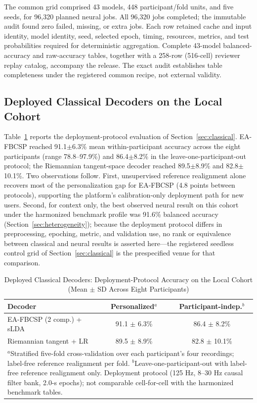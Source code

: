 \documentclass[journal,twoside,web]{template/ieeecolor2-tectonic}
\begin{document}
The common grid comprised 43 models, 448 participant/fold units, and five seeds, for 96,320 planned neural jobs. All 96,320 jobs completed; the immutable audit found zero failed, missing, or extra jobs. Each row retained cache and input identity, model identity, seed, selected epoch, timing, resources, metrics, and test probabilities required for deterministic aggregation. Complete 43-model balanced-accuracy and raw-accuracy tables, together with a 258-row (516-cell) reviewer replay catalog, accompany the release. The exact audit establishes table completeness under the registered common recipe, not external validity.

\subsection{Deployed Classical Decoders on the Local Cohort}

Table~\ref{tab:classical} reports the deployment-protocol evaluation of Section~\ref{sec:classical}. EA-FBCSP reached 91.1$\pm$6.3\% mean within-participant accuracy across the eight participants (range 78.8--97.9\%) and 86.4$\pm$8.2\% in the leave-one-participant-out protocol; the Riemannian tangent-space decoder reached 89.5$\pm$8.9\% and 82.8$\pm$10.1\%. Two observations follow. First, unsupervised reference realignment alone recovers most of the personalization gap for EA-FBCSP (4.8 points between protocols), supporting the platform's calibration-only deployment path for new users. Second, for context only, the best observed neural result on this cohort under the harmonized benchmark profile was 91.6\% balanced accuracy (Section~\ref{sec:heterogeneity}); because the deployment protocol differs in preprocessing, epoching, metric, and validation use, no rank or equivalence between classical and neural results is asserted here---the registered seedless control grid of Section~\ref{sec:classical} is the prespecified venue for that comparison.

\begin{table}[t]
\caption{Deployed Classical Decoders: Deployment-Protocol Accuracy on the Local Cohort (Mean $\pm$ SD Across Eight Participants)}
\label{tab:classical}
\centering
\scriptsize
\setlength{\tabcolsep}{4pt}
\begin{tabular}{lcc}
\toprule
Decoder & Personalized$^a$ & Participant-indep.$^b$ \\
\midrule
EA-FBCSP (2 comp.) + sLDA & 91.1 $\pm$ 6.3\% & 86.4 $\pm$ 8.2\% \\
Riemannian tangent + LR & 89.5 $\pm$ 8.9\% & 82.8 $\pm$ 10.1\% \\
\bottomrule
\multicolumn{3}{p{0.94\columnwidth}}{$^a$Stratified five-fold cross-validation over each participant's four recordings; label-free reference realignment per fold. $^b$Leave-one-participant-out with label-free reference realignment only. Deployment protocol (125 Hz, 8--30 Hz causal filter bank, 2.0-s epochs); not comparable cell-for-cell with the harmonized benchmark tables.} \\
\end{tabular}
\end{table}
\end{document}
